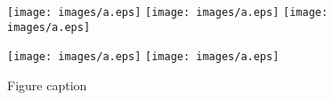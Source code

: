 \documentclass{article}
\begin{document}
\begin{figure}[htp]
\centering
\texttt{[image: images/a.eps]}\quad
\texttt{[image: images/a.eps]}\quad
\texttt{[image: images/a.eps]}

\medskip

\texttt{[image: images/a.eps]}\quad
\texttt{[image: images/a.eps]}

\caption{Figure caption}
\label{pics:blablabla}
\end{figure}
\end{document}
